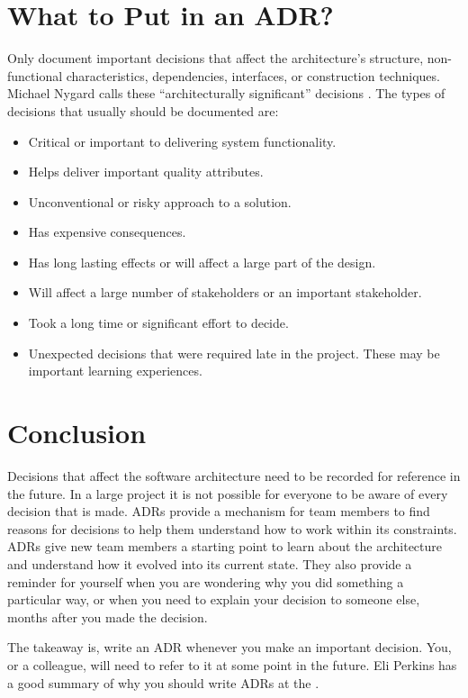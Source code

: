 \section{What to Put in an ADR?}
Only document important decisions that affect the architecture's structure,
non-functional characteristics, dependencies, interfaces, or construction techniques.
Michael Nygard calls these ``architecturally significant'' decisions \cite{nygard-adr}.
The types of decisions that usually should be documented are:
\begin{itemize}[noitemsep,nolistsep]
    \item Critical or important to delivering system functionality.
    \item Helps deliver important quality attributes.
    \item Unconventional or risky approach to a solution.
    \item Has expensive consequences.
    \item Has long lasting effects or will affect a large part of the design.
    \item Will affect a large number of stakeholders or an important stakeholder.
    \item Took a long time or significant effort to decide.
    \item Unexpected decisions that were required late in the project. These may be important learning experiences.
\end{itemize}

\section{Conclusion}
Decisions that affect the software architecture need to be recorded for reference in the future.
In a large project it is not possible for everyone to be aware of every decision that is made.
ADRs provide a mechanism for team members to find reasons for decisions to help them understand how to work within its constraints.
ADRs give new team members a starting point to learn about the architecture and understand how it evolved into its current state.
They also provide a reminder for yourself when you are wondering why you did something a particular way,
or when you need to explain your decision to someone else, months after you made the decision.

The takeaway is, write an ADR whenever you make an important decision.
You, or a colleague, will need to refer to it at some point in the future.
Eli Perkins has a good summary of why you should write ADRs at the
 \cite{why-write-adrs}.
